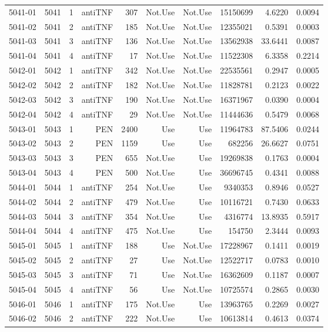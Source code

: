 {\begin{longtable}{ | r | r | r | r | r | r | r | r | r | r | }
5041-01 & 5041 & 1 & antiTNF & 307 & Not.Use & Not.Use & 15150699 & 4.6220 & 0.0094\\ 
5041-02 & 5041 & 2 & antiTNF & 185 & Not.Use & Not.Use & 12355021 & 0.5391 & 0.0003\\ 
5041-03 & 5041 & 3 & antiTNF & 136 & Not.Use & Not.Use & 13562938 & 33.6441 & 0.0087\\ 
5041-04 & 5041 & 4 & antiTNF & 17 & Not.Use & Not.Use & 11522308 & 6.3358 & 0.2214\\ 
5042-01 & 5042 & 1 & antiTNF & 342 & Not.Use & Not.Use & 22535561 & 0.2947 & 0.0005\\ 
5042-02 & 5042 & 2 & antiTNF & 182 & Not.Use & Not.Use & 11828781 & 0.2123 & 0.0022\\ 
5042-03 & 5042 & 3 & antiTNF & 190 & Not.Use & Not.Use & 16371967 & 0.0390 & 0.0004\\ 
5042-04 & 5042 & 4 & antiTNF & 29 & Not.Use & Not.Use & 11444636 & 0.5479 & 0.0068\\ 
5043-01 & 5043 & 1 & PEN & 2400 & Use & Use & 11964783 & 87.5406 & 0.0244\\ 
5043-02 & 5043 & 2 & PEN & 1159 & Use & Use & 682256 & 26.6627 & 0.0751\\ 
5043-03 & 5043 & 3 & PEN & 655 & Not.Use & Use & 19269838 & 0.1763 & 0.0004\\ 
5043-04 & 5043 & 4 & PEN & 500 & Not.Use & Use & 36696745 & 0.4341 & 0.0088\\ 
5044-01 & 5044 & 1 & antiTNF & 254 & Not.Use & Use & 9340353 & 0.8946 & 0.0527\\ 
5044-02 & 5044 & 2 & antiTNF & 479 & Not.Use & Use & 10116721 & 0.7430 & 0.0633\\ 
5044-03 & 5044 & 3 & antiTNF & 354 & Not.Use & Use & 4316774 & 13.8935 & 0.5917\\ 
5044-04 & 5044 & 4 & antiTNF & 475 & Not.Use & Use & 154750 & 2.3444 & 0.0093\\ 
5045-01 & 5045 & 1 & antiTNF & 188 & Use & Not.Use & 17228967 & 0.1411 & 0.0019\\ 
5045-02 & 5045 & 2 & antiTNF & 27 & Use & Not.Use & 12522717 & 0.0783 & 0.0010\\ 
5045-03 & 5045 & 3 & antiTNF & 71 & Use & Not.Use & 16362609 & 0.1187 & 0.0007\\ 
5045-04 & 5045 & 4 & antiTNF & 56 & Use & Not.Use & 10725574 & 0.2865 & 0.0030\\ 
5046-01 & 5046 & 1 & antiTNF & 175 & Not.Use & Use & 13963765 & 0.2269 & 0.0027\\ 
5046-02 & 5046 & 2 & antiTNF & 222 & Not.Use & Use & 10613814 & 0.4613 & 0.0374\\ 

\end{longtable}}
